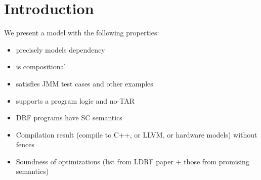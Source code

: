 \section{Introduction}
\label{sec:intro}


We present a model with the following properties:
\begin{itemize}
\item precisely models dependency
\item is compositional
\item satisfies JMM test cases and other examples
\item supports a program logic and no-TAR
\item DRF programs have SC semantics
\item Compilation result (compile to C++, or LLVM, or hardware models) without fences
\item Soundness of optimizations (list from LDRF paper + those from promising semantics)
\end{itemize}

